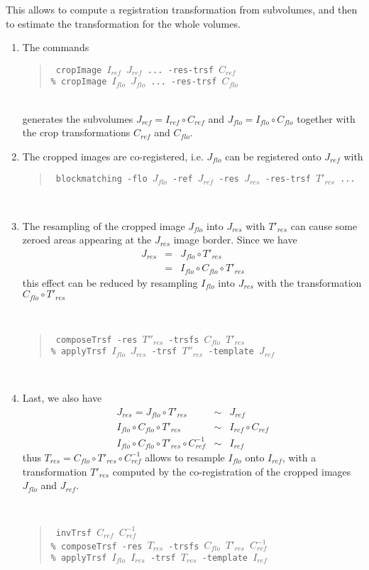 \documentclass[10pt]{report}
\def\applyTrsf{\texttt{applyTrsf} }
\def\blockmatching{\texttt{blockmatching} }
\def\composeTrsf{\texttt{composeTrsf} }
\def\cropImage{\texttt{cropImage} }
\def\invTrsf{\texttt{invTrsf} }
\newenvironment{code}[1]{\mbox{}\\[1ex]\hspace*{-#1cm}\begin{minipage}{150mm}\begin{quote}\tt}{\end{quote}\end{minipage}\mbox{}\\[1ex]}
\begin{document}
This allows to compute a registration transformation from subvolumes,
and then to estimate the transformation for the whole volumes. 

\begin{enumerate}

\item The commands
\begin{code}{0.8}
\% \cropImage $I_{ref}$ $J_{ref}$ ... -res-trsf $C_{ref}$ \\
\% \cropImage $I_{flo}$ $J_{flo}$ ... -res-trsf $C_{flo}$
\end{code}
generates the subvolumes $J_{ref} = I_{ref} \circ C_{ref}$ and $J_{flo} = I_{flo} \circ C_{flo}$ together with the crop transformations $C_{ref}$ and $C_{flo}$.

\item The cropped images are co-registered, i.e. $J_{flo}$ can be registered onto $J_{ref}$ with 
\begin{code}{0.8}
\% \blockmatching -flo $J_{flo}$ -ref $J_{ref}$ -res $J_{res}$ -res-trsf ${T'}_{res}$ ...
\end{code}

\item The resampling of the cropped image $J_{flo}$ into $J_{res}$
  with ${T'}_{res}$ can cause some zeroed areas appearing at the
  $J_{res}$ image border. 
Since we have 
\begin{eqnarray*}
J_{res} & = & J_{flo} \circ {T'}_{res} \\
        & = & I_{flo} \circ C_{flo}  \circ {T'}_{res} 
\end{eqnarray*}
this effect can be reduced by resampling $I_{flo}$ into $J_{res}$ with
the transformation $C_{flo}  \circ {T'}_{res}$

\begin{code}{0.8}
\% \composeTrsf -res $T''_{res}$ -trsfs $C_{flo}$  ${T'}_{res}$ \\
\% \applyTrsf $I_{flo}$ $J_{res}$ -trsf $T''_{res}$ -template $J_{ref}$ 
\end{code}

\item Last, we also have
\begin{eqnarray*}
J_{res} = J_{flo} \circ {T'}_{res} & \sim & J_{ref} \\
I_{flo} \circ C_{flo} \circ {T'}_{res} & \sim &  I_{ref} \circ C_{ref} \\
I_{flo} \circ C_{flo} \circ {T'}_{res} \circ C^{-1}_{ref} & \sim & I_{ref}
\end{eqnarray*}
thus $T_{res} = C_{flo} \circ {T'}_{res} \circ C^{-1}_{ref}$ allows to
resample $I_{flo}$ onto $I_{ref}$, with a transformation ${T'}_{res}$
computed by the co-registration of the cropped images $J_{flo}$ and $J_{ref}$.

\begin{code}{0.8}
\% \invTrsf $C_{ref}$ $C^{-1}_{ref}$  \\
\% \composeTrsf -res $T_{res}$ -trsfs $C_{flo}$  ${T'}_{res}$ $C^{-1}_{ref}$ \\
\% \applyTrsf $I_{flo}$ $I_{res}$ -trsf $T_{res}$ -template $I_{ref}$ 
\end{code}

\end{enumerate}
\end{document}
